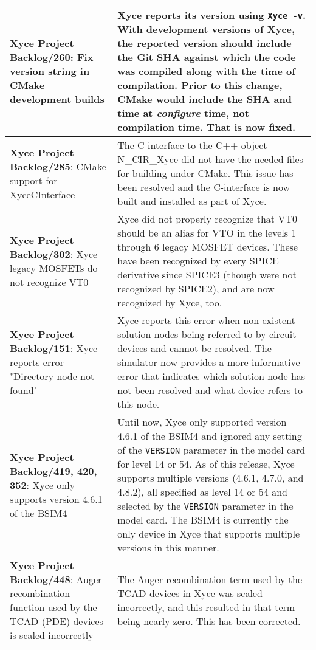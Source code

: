 {\begin{longtable}[h] {>{\raggedright\small}m{2in}|>{\raggedright\let\\\tabularnewline\small}m{3.5in}}
\textbf{Xyce Project Backlog/260}: Fix version string in CMake development builds &
Xyce reports its version using \texttt{Xyce -v}.  With development versions of
Xyce, the reported version should include the Git SHA against which the code
was compiled along with the time of compilation. Prior to this change, CMake
would include the SHA and time at \emph{configure} time, not compilation time.
That is now fixed. \\ \hline

\textbf{Xyce Project Backlog/285}: CMake support for XyceCInterface &
The C-interface to the C++ object N\_CIR\_Xyce did not have the needed
files for building under CMake.  This issue has been resolved and the 
C-interface is now built and installed as part of Xyce. \\ \hline

\textbf{Xyce Project Backlog/302}: Xyce legacy MOSFETs do not recognize VT0 &
Xyce did not properly recognize that VT0 should be an alias for VTO in
the levels 1 through 6 legacy MOSFET devices.  These have been
recognized by every SPICE derivative since SPICE3 (though were not
recognized by SPICE2), and are now recognized by Xyce, too. \\ \hline

\textbf{Xyce Project Backlog/151}: Xyce reports error "Directory node not found" &
Xyce reports this error when non-existent solution nodes being referred to
by circuit devices and cannot be resolved.  The simulator now provides a more
informative error that indicates which solution node has not been resolved and
what device refers to this node. \\ \hline

\textbf{Xyce Project Backlog/419, 420, 352}:  Xyce only supports version 4.6.1 of the BSIM4 &
Until now, Xyce only supported version 4.6.1 of the BSIM4 and ignored
any setting of the \texttt{VERSION} parameter in the model card for level
14 or 54.  As of this release, Xyce supports multiple versions (4.6.1,
4.7.0, and 4.8.2), all specified as level 14 or 54 and selected by
the \texttt{VERSION} parameter in the model card.  The BSIM4 is
currently the only device in Xyce that supports multiple versions in
this manner. \\ \hline


\textbf{Xyce Project Backlog/448}:  Auger recombination function used by 
the TCAD (PDE) devices is scaled incorrectly & The Auger recombination term 
used by the TCAD devices in Xyce was scaled incorrectly, and this resulted 
in that term being nearly zero.  This has been corrected.
\\ \hline


\end{longtable}}
